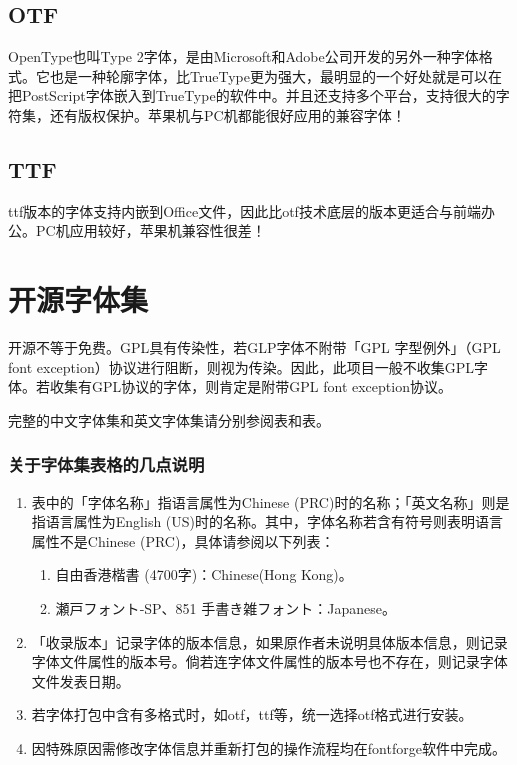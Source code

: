 \documentclass{../../PublicResources/DocClass}
\begin{document}
\subsection{OTF}
OpenType也叫Type 2字体，是由Microsoft和Adobe公司开发的另外一种字体格式。它也是一种轮廓字体，比TrueType更为强大，最明显的一个好处就是可以在把PostScript字体嵌入到TrueType的软件中。并且还支持多个平台，支持很大的字符集，还有版权保护。苹果机与PC机都能很好应用的兼容字体！

\subsection{TTF}
ttf版本的字体支持内嵌到Office文件，因此比otf技术底层的版本更适合与前端办公。PC机应用较好，苹果机兼容性很差！

\section{开源字体集}
开源不等于免费。GPL具有传染性，若GLP字体不附带「GPL 字型例外」（GPL font exception）协议进行阻断，则视为传染。因此，此项目一般不收集GPL字体。若收集有GPL协议的字体，则肯定是附带GPL font exception协议。

完整的中文字体集和英文字体集请分别参阅表和表。

\subsubsection{关于字体集表格的几点说明}
\begin{enumerate}
    \item 表中的「字体名称」指语言属性为Chinese (PRC)时的名称；「英文名称」则是指语言属性为English (US)时的名称。其中，字体名称若含有\textsuperscript{\dag}符号则表明语言属性不是Chinese (PRC)，具体请参阅以下列表：
    \begin{enumerate}
        \item 自由香港楷書 (4700字)\dag：Chinese(Hong Kong)。
        \item 瀬戸フォント‑SP\dag、851 手書き雑フォント\dag：Japanese。
    \end{enumerate}
    \item 「收录版本」记录字体的版本信息，如果原作者未说明具体版本信息，则记录字体文件属性的版本号。倘若连字体文件属性的版本号也不存在，则记录字体文件发表日期。
    \item 若字体打包中含有多格式时，如otf，ttf等，统一选择otf格式进行安装。
    \item 因特殊原因需修改字体信息并重新打包的操作流程均在fontforge软件中完成。
\end{enumerate}
\end{document}
